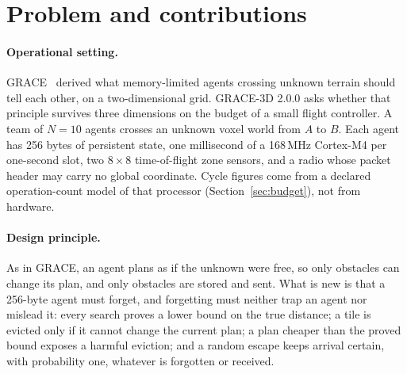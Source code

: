 \documentclass[11pt,a4paper]{article}
\begin{document}
\section{Problem and contributions}\label{sec:claim}

\paragraph{Operational setting.} GRACE~\cite{v1} derived what memory-limited agents crossing unknown terrain should tell
each other, on a two-dimensional grid. GRACE-3D 2.0.0 asks whether that principle survives three dimensions on the
budget of a small flight controller. A team of $N=10$ agents crosses an unknown voxel world from $A$ to $B$. Each agent
has 256 bytes of persistent state, one millisecond of a 168\,MHz Cortex-M4 per one-second slot, two $8\times8$
time-of-flight zone sensors, and a radio whose packet header may carry no global coordinate. Cycle figures come from a
declared operation-count model of that processor (Section~\ref{sec:budget}), not from hardware.

\paragraph{Design principle.} As in GRACE, an agent plans as if the unknown were free, so only obstacles can change its
plan, and only obstacles are stored and sent. What is new is that a 256-byte agent must forget, and forgetting must
neither trap an agent nor mislead it: every search proves a lower bound on the true distance; a tile is evicted only
if it cannot change the current plan; a plan cheaper than the proved bound exposes a harmful eviction; and a random
escape keeps arrival certain, with probability one, whatever is forgotten or received.
\end{document}
